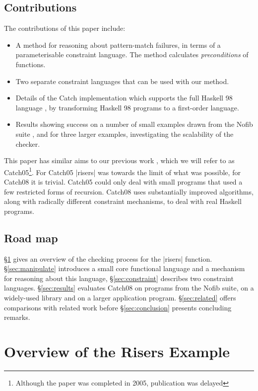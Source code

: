 \documentclass[preprint]{sigplanconf}
\begin{document}
\subsection{Contributions}

The contributions of this paper include:

\begin{itemize}
\item A method for reasoning about pattern-match failures, in terms of a parameterisable constraint language. The method calculates \textit{preconditions} of functions.
\item Two separate constraint languages that can be used with our method.
\item Details of the Catch implementation which supports the full Haskell 98 language \cite{haskell}, by transforming Haskell 98 programs to a first-order language.
\item Results showing success on a number of small examples drawn from the Nofib suite \cite{nofib}, and for three larger examples, investigating the scalability of the checker.
\end{itemize}

This paper has similar aims to our previous work \cite{me:catch_tfp}, which we will refer to as Catch05\footnote{Although the paper was completed in 2005, publication was delayed}. For Catch05 |risers| was towards the limit of what was possible, for Catch08 it is trivial. Catch05 could only deal with small programs that used a few restricted forms of recursion. Catch08 uses substantially improved algorithms, along with radically different constraint mechanisms, to deal with real Haskell programs.

\subsection{Road map}

\S\ref{sec:walkthrough} gives an overview of the checking process for the |risers| function. \S\ref{sec:manipulate} introduces a small core functional language and a mechanism for reasoning about this language, \S\ref{sec:constraint} describes two constraint languages. \S\ref{sec:results} evaluates Catch08 on programs from the Nofib suite, on a widely-used library and on a larger application program. \S\ref{sec:related} offers comparisons with related work before \S\ref{sec:conclusion} presents concluding remarks.

\section{Overview of the Risers Example}
\label{sec:walkthrough}
\end{document}
